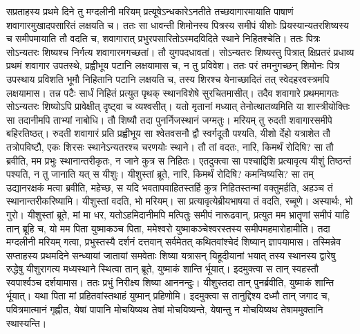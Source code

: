 \adhyAya
{}
\vakya सप्रताहस्य प्रथमे दिने तु मग्दलीनी मरियम् प्रत्यूषेऽन्धकारेऽनतीते तच्छवागारमायाति पाषाणं शवागारमुखादपसारितं लक्षयति च।
\vakya ततः सा धावन्ती शिमोनस्य पित्रस्य समीपं यीशोः प्रियस्यान्यतरशिष्यस्य च समीपमायाति तौ वदति च, शवागारात् प्रभुरपसारितोऽस्मदविदिते स्थाने निहितश्चेति।
\vakya ततः पित्रः सोऽन्यतरः शिष्यश्च निर्गत्य शवागारमगच्छतां।
\vakya तौ युगपदधावतां। सोऽन्यतरः शिष्यस्तु पित्रात् क्षिप्रतरं प्रधाव्य प्रथमं शवागार उपतस्थे,
\vakya प्रह्वीभूय पटानि लक्षयामास च, न तु प्रविवेश।
\vakya ततः परं तमनुगच्छन् शिमोनः पित्र उपस्थाय प्रविशति भूमौ निहितानि पटानि लक्षयति च,
\vakya तस्य शिरश्च येनाच्छादितं तत् स्वेदहरवस्त्रमपि लक्षयामास। तन्न पटैः सार्धं निहितं प्रत्युत पृथक् स्थानविशेषे सुरचितमासीत्।
\vakya तदैव शवागारे प्रथममागतः सोऽन्यतरः शिष्योऽपि प्रावेक्षीत् दृष्ट्वा च व्यश्वसीत्।
\vakya यतो मृतानां मध्यात् तेनोत्थातव्यमिति या शास्त्रीयोक्तिः सा तदानीमपि ताभ्यां नाबोधि।
\vakya तौ शिष्यौ तदा पुनर्निजस्थानं जग्मतुः।
\vakya मरियम् तु रुदती शवागारसमीपे बहिरतिष्ठत्। रुदती शवागारं प्रति प्रह्वीभूय सा श्वेतवसनौ द्वौ स्वर्गदूतौ पश्यति,
\vakya यीशो र्देहो यत्राशेत तौ तत्रोपविष्टौ, एकः शिरसः स्थानेऽन्यतरश्च चरणयोः स्थाने।
\vakya तौ तां वदतः, नारि, किमर्थं रोदिषि? सा तौ ब्रवीति, मम प्रभुः स्थानान्तरीकृतः, न जाने कुत्र स निहितः।
\vakya एतदुक्त्वा सा पश्चाद्दिशि प्रत्यावृत्य यीशुं तिष्ठन्तं पश्यति, न तु जानाति यत् स यीशुः।
\vakya यीशुस्तां ब्रूते, नारि, किमर्थं रोदिषि? कमन्विष्यसि? सा तम् उद्यानरक्षकं मत्वा ब्रवीति, महेच्छ, स यदि भवतापवाहितस्तर्हि कुत्र निहितस्तन्मां वक्तुमर्हति, अहञ्च तं स्थानान्तरीकरिष्यामि।
\vakya यीशुस्तां वदति, भो मरियम्। सा प्रत्यावृत्येब्रीयभाषया तं वदति, रब्बूणे। अस्यार्थः, भो गुरो।
\vakya यीशुस्तां ब्रूते, मां मा धर, यतोऽहमिदानीमपि मत्पितुः समीपं नारूढवान्, प्रत्युत मम भ्रातॄणां समीपं याहि तान् ब्रूहि च, यो मम पिता युष्माकञ्च पिता, ममेश्वरो युष्माकञ्चेश्वरस्तस्य समीपमहमारोहामीति।
\vakya तदा मग्दलीनी मरियम् गत्वा, प्रभुस्तस्यै दर्शनं दत्तवान् सर्वमेतत् कथितवांश्चेदं शिष्यान् ज्ञापयामास।
\vakya तस्मिन्नेव सप्ताहस्य प्रथमदिने सन्ध्यायां जातायां समवेताः शिष्या यत्रासन् यिहूदीयानां भयात् तस्य स्थानस्य द्वारेषु रुद्धेषु यीशुरागत्य मध्यस्थाने स्थित्वा तान् ब्रूते, युष्माकं शान्ति र्भूयात्।
\vakya इदमुक्त्वा स तान् स्वहस्तौ स्वपार्श्वञ्च दर्शयामास। ततः प्रभुं निरीक्ष्य शिष्या आननन्दुः।
\vakya यीशुस्तदा तान् पुनर्ब्रवीति, युष्माकं शान्ति र्भूयात्। यथा पिता मां प्रहितवांस्तथाहं युष्मान् प्रहिणोमि।
\vakya इदमुक्त्वा स तानुद्दिश्य दध्मौ तान् जगाद च, पवित्रमात्मानं गृह्णीत,
\vakya येषां पापानि मोचयिष्यथ तेषां मोचयिष्यन्ते, येषान्तु न मोचयिष्यथ तेषाममुक्तानि स्थास्यन्ति।
